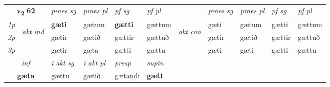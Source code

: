 \noindent
\begin{tabular}{lllllllllll} \toprule
\multicolumn{2}{c}{\textbf{v{\textsubscript{2}}} \Large{\textbf{62}}}  &  \textit{praes sg}  & \textit{praes pl}  &\textit{ pf sg} & \textit{pf pl} &  &  \textit{praes sg}  & \textit{praes pl}  & \textit{pf sg} & \textit{pf pl } \\*
	\cmidrule{3-6} \cmidrule{8-11}
 {\textit{1p}} & \multirow{3}{*}{\begin{turn}{90}\textit{akt ind}\end{turn}} & \textbf{gæti} & gætum & \textbf{gætti} & gættum & \multirow{3}{*}{\begin{turn}{90}\textit{akt con}\end{turn}} &gæti & gætum & gætti & gættum\\*
 {\textit{2p}} &  &  gætir  & gætið & gættir & gættuð & & gætir & gætið & gættir & gættuð \\*
{\textit{3p}} &  & gætir & gæta & gætti & gættu & & gæti & gæti& gætti & gættu \\*
\cmidrule{3-6} \cmidrule{8-11}

   \multicolumn{2}{c}{\textit{inf}}  & \textit{i akt sg} & \textit{i akt pl}   & \textit{presp} & \textit{supin}   \\*
  \multicolumn{2}{c}{\textbf{gæta}} & gættu  & gætið   & gætandi &  \textbf{gætt}   \\*
\end{tabular}

